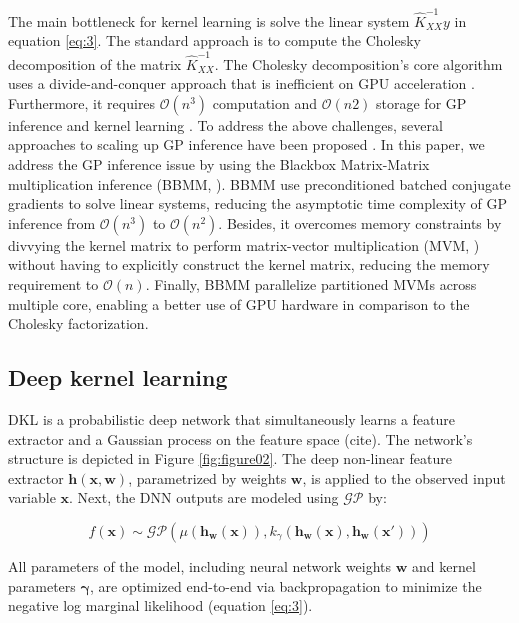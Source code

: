 \documentclass[a4paper, nobind]{templates/cdethesis}
\begin{document}
The main bottleneck for kernel learning is solve the linear system \(\widehat{K}_{XX}^{-1}y\) in equation \ref{eq:3}. The standard approach is to compute the Cholesky decomposition of the matrix \(\widehat{K}_{XX}^{-1}\). The Cholesky decomposition's core algorithm uses a divide-and-conquer approach that is inefficient on GPU acceleration \cite{krishnamoorthy2013matrix}. Furthermore, it requires \(\mathcal{O}(n^{3})\) computation and \(\mathcal{O}(n2)\) storage for GP inference and kernel learning \cite{rasmussen2003gaussian}. To address the above challenges, several approaches to scaling up GP inference have been proposed \cite{gardner2018gpytorch, cunningham2008fast, dong2017scalable, bach2013sharp, wilson2015thoughts}. In this paper, we address the GP inference issue by using the Blackbox Matrix-Matrix multiplication inference (BBMM, \cite{gardner2018gpytorch}). BBMM use preconditioned batched conjugate gradients to solve linear systems, reducing the asymptotic time complexity of GP inference from \(\mathcal{O}(n^{3})\) to \(\mathcal{O}(n^{2})\). Besides, it overcomes memory constraints by divvying the kernel matrix to perform matrix-vector multiplication (MVM, \cite{demmel1997applied}) without having to explicitly construct the kernel matrix, reducing the memory requirement to \(\mathcal{O}(n)\). Finally, BBMM parallelize partitioned MVMs across multiple core, enabling a better use of GPU hardware in comparison to the Cholesky factorization.

\subsection{Deep kernel learning}

DKL is a probabilistic deep network that simultaneously learns a feature
extractor and a Gaussian process on the feature space (cite). The network's
structure is depicted in Figure \ref{fig:figure02}. The deep non-linear feature extractor \(\mathbf{h(x,w)}\), parametrized by weights \(\mathbf{w}\), is applied to the observed input variable \(\mathbf{x}\). Next, the DNN outputs are modeled using \(\mathcal{GP}\) by:

\begin{equation}
f(\mathbf{x}) \sim \mathcal{GP}(
    \mu(\mathbf{h_w(x)}),
    k_{\gamma}(\mathbf{h_w(x)}, \mathbf{h_w({x}')})
)
\end{equation}

All parameters of the model, including neural network weights \(\mathbf{w}\) and kernel parameters \(\mathbf{\gamma}\), are optimized end-to-end via backpropagation to minimize the negative log marginal likelihood (equation \ref{eq:3}).
\end{document}
